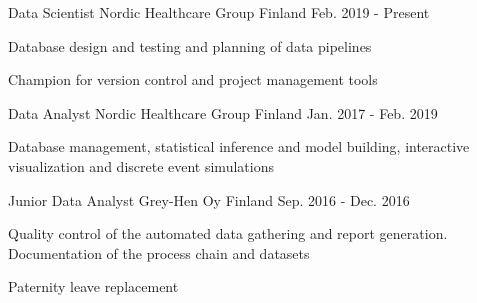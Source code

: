 
\begin{cventries}


  \cventry
    {Data Scientist} %
    {Nordic Healthcare Group} %
    {Finland} %
    {Feb. 2019 - Present} %
    {
      \begin{cvitems} %
        \item {Database design and testing and planning of data pipelines}
        \item {Champion for version control and project management tools}
      \end{cvitems}
    }

  \cventry
    {Data Analyst} %
    {Nordic Healthcare Group} %
    {Finland} %
    {Jan. 2017 - Feb. 2019} %
    {
      \begin{cvitems} %
        \item {Database management, statistical inference and model building, interactive visualization and discrete event simulations}
      \end{cvitems}
    }

  \cventry
    {Junior Data Analyst} %
    {Grey-Hen Oy} %
    {Finland} %
    {Sep. 2016 - Dec. 2016} %
    {
      \begin{cvitems} %
        \item {Quality control of the automated data gathering and report generation. Documentation of the process chain and datasets}
        \item {Paternity leave replacement}
      \end{cvitems}
    }


\end{cventries}
